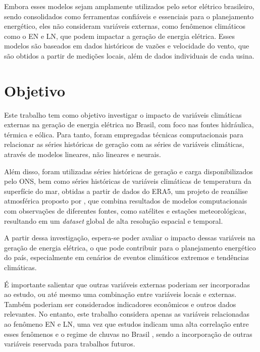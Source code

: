 Embora esses modelos sejam amplamente utilizados pelo setor elétrico brasileiro, sendo consolidados como ferramentas
confiáveis e essenciais para o planejamento energético, eles não consideram variáveis externas, como fenômenos climáticos
como o EN e LN, que podem impactar a geração de energia elétrica. Esses modelos são baseados em dados históricos de
vazões e velocidade do vento, que são obtidos a partir de medições locais, além de dados individuais de cada usina.

\section{Objetivo}
Este trabalho tem como objetivo investigar o impacto de variáveis climáticas externas na geração 
de energia elétrica no Brasil, com foco nas fontes hidráulica, térmica e eólica. Para tanto, foram empregadas técnicas 
computacionais para relacionar as séries históricas de geração com as séries de variáveis 
climáticas, através de modelos lineares, não lineares e neurais. 

Além disso, foram utilizadas séries históricas de geração e carga disponibilizados pelo ONS, bem como séries históricas de variáveis 
climáticas de temperatura da superfície do mar, obtidas a partir de dados do ERA5, um projeto de reanálise atmosférica 
proposto por , que combina resultados de modelos computacionais com observações de diferentes fontes,
como satélites e estações meteorológicas, resultando em um \textit{dataset} global de alta resolução espacial e temporal.

A partir dessa investigação, espera-se poder avaliar o impacto dessas variáveis na geração de energia elétrica,
o que pode contribuir para o planejamento energético do país, especialmente em cenários de eventos climáticos extremos e
tendências climáticas.

É importante salientar que outras variáveis externas poderiam ser incorporadas ao estudo, ou até mesmo uma combinação entre
 variáveis locais e externas. Também poderiam ser considerados indicadores econômicos e outros dados relevantes. 
No entanto, este trabalho considera apenas as variáveis relacionadas ao fenômeno EN e LN, uma vez que estudos indicam
uma alta correlação entre esses fenômenos e o regime de chuvas no Brasil \cite{de2012influencia, Andreoli2016}, sendo a 
incorporação de outras variáveis reservada para trabalhos futuros.

